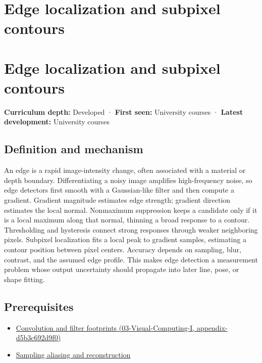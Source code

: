 \hypertarget{appendix-36022286b03e}{}
\section*{Edge localization and subpixel contours}
\section{Edge localization and subpixel contours}\label{appendix-36022286b03e-edge-localization-and-subpixel-contours}

\textbf{Curriculum depth:} Developed · \textbf{First seen:} University courses · \textbf{Latest development:} University courses

\subsection{Definition and mechanism}\label{appendix-36022286b03e-definition-and-mechanism}

An edge is a rapid image-intensity change, often associated with a material or depth boundary. Differentiating a noisy image amplifies high-frequency noise, so edge detectors first smooth with a Gaussian-like filter and then compute a gradient. Gradient magnitude estimates edge strength; gradient direction estimates the local normal. Nonmaximum suppression keeps a candidate only if it is a local maximum along that normal, thinning a broad response to a contour. Thresholding and hysteresis connect strong responses through weaker neighboring pixels. Subpixel localization fits a local peak to gradient samples, estimating a contour position between pixel centers. Accuracy depends on sampling, blur, contrast, and the assumed edge profile. This makes edge detection a measurement problem whose output uncertainty should propagate into later line, pose, or shape fitting.

\subsection{Prerequisites}\label{appendix-36022286b03e-prerequisites}

\begin{itemize}
\tightlist
\item
  \href{../03-Visual-Computing-I/main.pdf\#nameddest=appendix-d5b3c692d9f0}{Convolution and filter footprints (03-Visual-Computing-I, appendix-d5b3c692d9f0)}
\item
  \hyperref[appendix-6a7869dd79a6]{Sampling aliasing and reconstruction}
\end{itemize}

